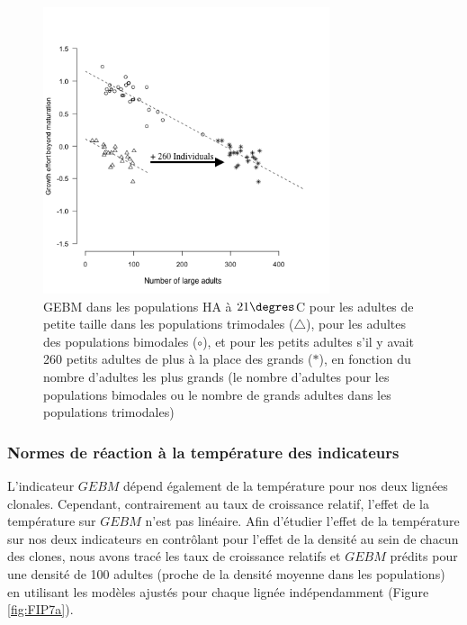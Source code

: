 \begin{figure}[!ht]
\begin{center}
\includegraphics[width=0.75\textwidth]{1_CorpsDeThese/Resumes/Fig/FIP06}
\caption[GEBM dans les
populations HA à $21\degres$C]{GEBM dans les
populations HA à $21\degres$C pour les adultes de petite taille dans les
populations trimodales ($\triangle$), pour les adultes des populations bimodales
($\circ$), et pour les petits adultes s'il y avait 260 petits adultes de plus à
la place des grands ($\ast$), en fonction du nombre d'adultes les plus grands
(le nombre d'adultes pour les populations bimodales ou le nombre de grands
adultes dans les populations trimodales)}
\label{fig:FIP6}
\end{center}
\end{figure}

\subsubsection{Normes de réaction à la température des indicateurs}

L'indicateur $GEBM$ dépend également de la température pour nos deux lignées
clonales. Cependant, contrairement au taux de croissance relatif, l'effet de la
température sur $GEBM$ n'est pas linéaire. Afin d'étudier l'effet de la
température sur nos deux indicateurs en contrôlant pour l'effet de la densité au
sein de chacun des clones, nous avons tracé les taux de croissance relatifs et
$GEBM$ prédits pour une densité de 100 adultes (proche de la densité moyenne
dans les populations) en utilisant les modèles ajustés pour chaque lignée
indépendamment (Figure \ref{fig:FIP7a}).


